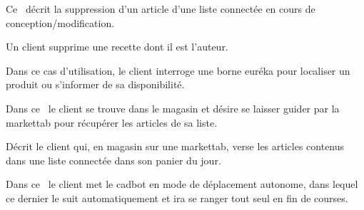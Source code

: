 Ce \cu\ décrit la suppression d'un article d'une liste connectée en cours de conception/modification.

Un client supprime une recette dont il est l'auteur.

Dans ce cas d'utilisation, le client interroge une borne euréka pour localiser un produit ou s'informer de sa disponibilité.

Dans ce \cu\ le client se trouve dans le magasin et désire se laisser guider par la markettab pour récupérer les articles de sa liste.

Décrit le client qui, en magasin sur une markettab, verse les articles contenus dans une liste connectée dans son panier du jour.

Dans ce \cu\ le client met le cadbot en mode de déplacement autonome, dans lequel ce dernier le suit automatiquement et ira se ranger tout seul en fin de courses.
\par
